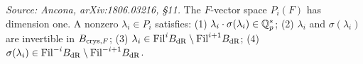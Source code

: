 \begin{proposition}
  \label{prop:periods-ram-dim}
  \textit{Source: Ancona, arXiv:1806.03216, \S11.}
  The \(F\)-vector space \(P_i(F)\) has dimension one. A nonzero
  \(\lambda_i \in P_i\) satisfies:
  (1) \(\lambda_i \cdot \sigma(\lambda_i) \in \mathbb{Q}_p^*\);
  (2) \(\lambda_i\) and \(\sigma(\lambda_i)\) are invertible in \(B_{\mathrm{crys},F}\);
  (3) \(\lambda_i \in \mathrm{Fil}^i B_{\mathrm{dR}} \setminus \mathrm{Fil}^{i+1} B_{\mathrm{dR}}\);
  (4) \(\sigma(\lambda_i) \in \mathrm{Fil}^{-i} B_{\mathrm{dR}} \setminus \mathrm{Fil}^{-i+1} B_{\mathrm{dR}}\).
\end{proposition}

